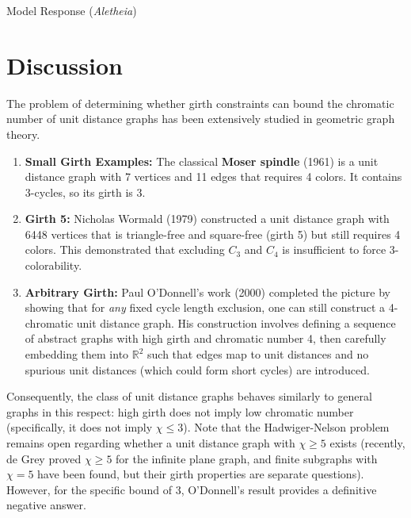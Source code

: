 \documentclass[11pt]{article}
\begin{document}
\begin{solution}{Model Response (\emph{Aletheia})}
\section*{Discussion}
The problem of determining whether girth constraints can bound the chromatic number of unit distance graphs has been extensively studied in geometric graph theory.



\begin{enumerate}
    \item \textbf{Small Girth Examples:} The classical \textbf{Moser spindle} (1961) is a unit distance graph with 7 vertices and 11 edges that requires 4 colors. It contains 3-cycles, so its girth is 3.
    \item \textbf{Girth 5:} Nicholas Wormald (1979) constructed a unit distance graph with 6448 vertices that is triangle-free and square-free (girth 5) but still requires 4 colors. This demonstrated that excluding $C_3$ and $C_4$ is insufficient to force 3-colorability.
    \item \textbf{Arbitrary Girth:} Paul O'Donnell's work (2000) completed the picture by showing that for \textit{any} fixed cycle length exclusion, one can still construct a 4-chromatic unit distance graph. His construction involves defining a sequence of abstract graphs with high girth and chromatic number 4, then carefully embedding them into $\mathbb{R}^2$ such that edges map to unit distances and no spurious unit distances (which could form short cycles) are introduced.
\end{enumerate}

Consequently, the class of unit distance graphs behaves similarly to general graphs in this respect: high girth does not imply low chromatic number (specifically, it does not imply $\chi \le 3$). Note that the Hadwiger-Nelson problem remains open regarding whether a unit distance graph with $\chi \ge 5$ exists (recently, de Grey proved $\chi \ge 5$ for the infinite plane graph, and finite subgraphs with $\chi=5$ have been found, but their girth properties are separate questions). However, for the specific bound of 3, O'Donnell's result provides a definitive negative answer.


\end{solution}
\end{document}
